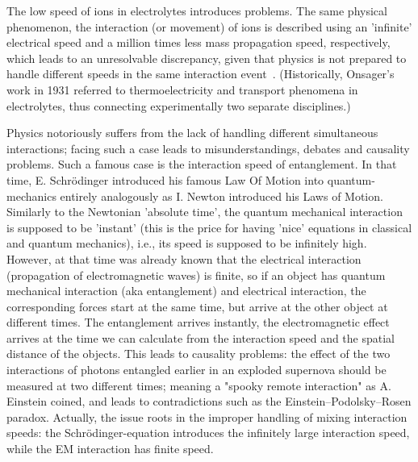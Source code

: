 The low speed of ions in electrolytes introduces problems.
The same physical phenomenon,
the interaction (or movement) of ions is described using an 'infinite' electrical speed and 
a million times less mass propagation speed, respectively, which leads
to an unresolvable discrepancy, given that physics is not prepared to handle
different speeds in the same interaction event~\cite{VeghNon-ordinaryLaws:2025}.
(Historically, Onsager's work in 1931 referred to thermoelectricity and transport phenomena in electrolytes, thus connecting experimentally two separate disciplines.)

Physics notoriously suffers from the lack of handling
\hypertarget{MixingSpeeds}{different simultaneous interactions}; facing such a case leads to misunderstandings, debates and causality problems.
Such a famous case is the interaction speed of entanglement.
In that time, E. Schrödinger introduced his famous Law Of Motion into quantum-mechanics entirely analogously
as I. Newton introduced his Laws of Motion.
Similarly to the Newtonian 'absolute time', the quantum mechanical interaction is supposed to be 'instant'
(this is the price for having 'nice' equations in classical and quantum mechanics),
i.e., its speed is supposed to be infinitely high.
However, at that time was already known that the electrical interaction (propagation of electromagnetic waves) is finite,
so if an object has quantum mechanical interaction (aka entanglement) 
and electrical interaction, the corresponding forces start at the same time, but arrive at the other object at different times.
The entanglement arrives instantly, the electromagnetic effect arrives at the time we can calculate from the interaction speed and the spatial distance of the objects.
This leads to causality problems: the effect of the two interactions of photons entangled earlier in an exploded supernova should be measured at two different times; meaning a "spooky remote interaction" as A. Einstein coined,
and leads to contradictions such as the Einstein–Podolsky–Rosen paradox.
Actually, the issue roots in the improper handling of mixing interaction speeds:
the Schrödinger-equation introduces the infinitely large interaction speed,
while the
\gls{EM}
interaction has finite speed.



